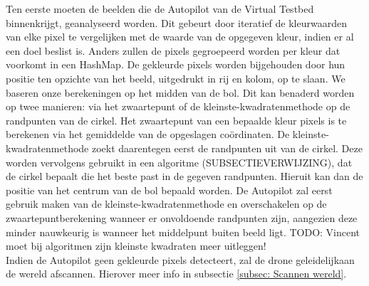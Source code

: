 \noindent
Ten eerste moeten de beelden die de Autopilot van de Virtual Testbed binnenkrijgt, geanalyseerd worden. Dit gebeurt door iteratief de kleurwaarden van elke pixel te vergelijken met de waarde van de opgegeven kleur, indien er al een doel beslist is. Anders zullen de pixels gegroepeerd worden per kleur dat voorkomt in een HashMap. De gekleurde pixels worden bijgehouden door hun positie ten opzichte van het beeld, uitgedrukt in rij en kolom, op te slaan. We baseren onze berekeningen op het midden van de bol. Dit kan benaderd worden op twee manieren: via het zwaartepunt of de kleinste-kwadratenmethode op de randpunten van de cirkel. Het zwaartepunt van een bepaalde kleur pixels is te berekenen via het gemiddelde van de opgeslagen co\"ordinaten. De kleinste-kwadratenmethode zoekt daarentegen eerst de randpunten uit van de cirkel. Deze worden vervolgens gebruikt in een algoritme (SUBSECTIEVERWIJZING), dat de cirkel bepaalt die het beste past in de gegeven randpunten. Hieruit kan dan de positie van het centrum van de bol bepaald worden. \cite{website:kleinsteKwadraten} De Autopilot zal eerst gebruik maken van de kleinste-kwadratenmethode en overschakelen op de zwaartepuntberekening wanneer er onvoldoende randpunten zijn, aangezien deze minder nauwkeurig is wanneer het middelpunt buiten beeld ligt.
TODO: Vincent moet bij algoritmen zijn kleinste kwadraten meer uitleggen!
\\
Indien de Autopilot geen gekleurde pixels detecteert, zal de drone geleidelijkaan de wereld afscannen. Hierover meer info in subsectie \ref{subsec: Scannen wereld}.